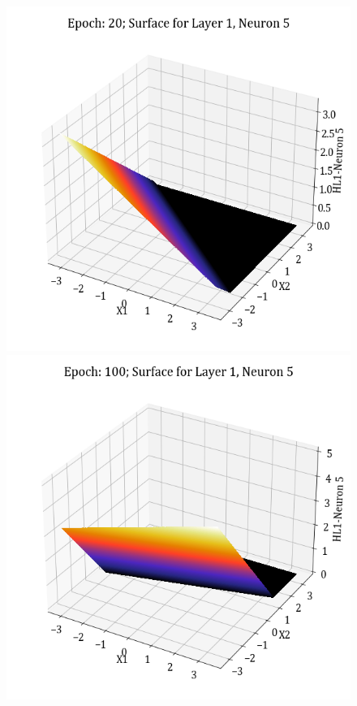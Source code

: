 \documentclass[11pt,a4paper]{article}
\begin{document}
\begin{figure}[H]
    \includegraphics[scale=0.4]{images/1B_MLFFNN_E20_HL1_N5.png}
    \includegraphics[scale=0.4]{images/1B_MLFFNN_E100_HL1_N5.png}

\end{figure}
\end{document}
